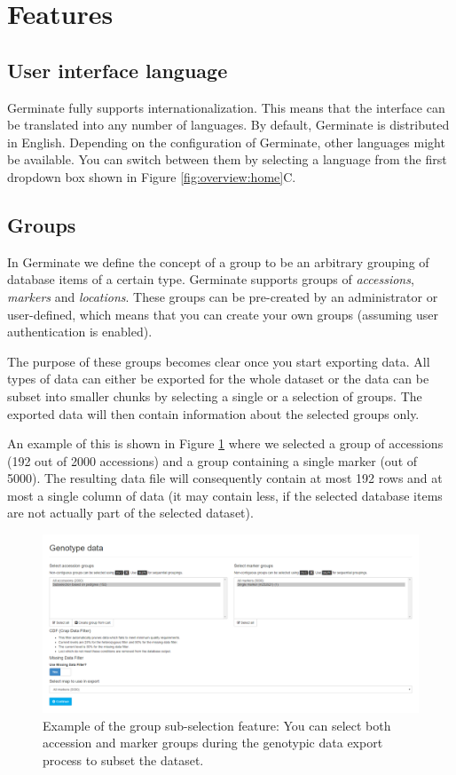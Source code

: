 \section{Features}

\subsection{User interface language}
\label{sec:features:language-selector}
Germinate fully supports internationalization. This means that the interface can be translated into any number of languages. By default, Germinate is distributed in English. Depending on the configuration of Germinate, other languages might be available. You can switch between them by selecting a language from the first dropdown box shown in Figure \ref{fig:overview:home}C.

\subsection{Groups}
In Germinate we define the concept of a group to be an arbitrary grouping of database items of a certain type. Germinate supports groups of \textit{accessions}, \textit{markers} and \textit{locations}. These groups can be pre-created by an administrator or user-defined, which means that you can create your own groups (assuming user authentication is enabled).

The purpose of these groups becomes clear once you start exporting data. All types of data can either be exported for the whole dataset or the data can be subset into smaller chunks by selecting a single or a selection of groups. The exported data will then contain information about the selected groups only.

An example of this is shown in Figure \ref{fig:features:group-subselection} where we selected a group of accessions (192 out of 2000 accessions) and a group containing a single marker (out of 5000). The resulting data file will consequently contain at most 192 rows and at most a single column of data (it may contain less, if the selected database items are not actually part of the selected dataset).

\begin{figure}
	\centering
	\includegraphics[width=0.85\linewidth]{img/features/group-subselection.png}
	\caption{Example of the group sub-selection feature: You can select both accession and marker groups during the genotypic data export process to subset the dataset.}
	\label{fig:features:group-subselection}
\end{figure}

